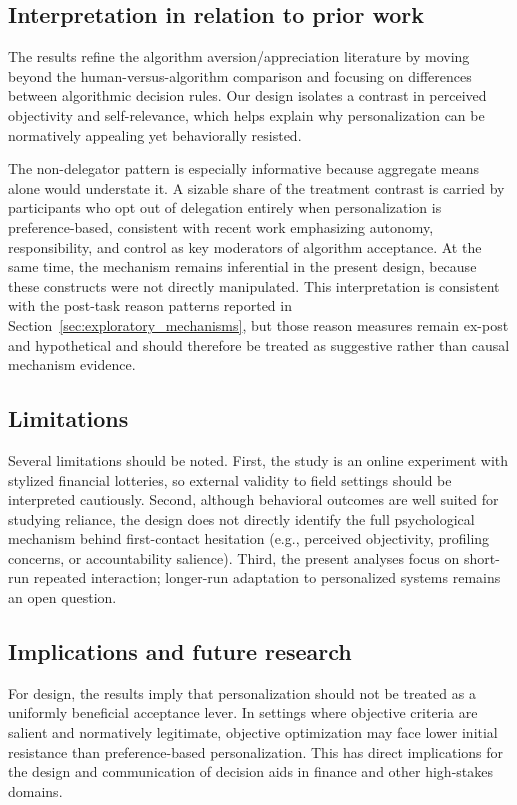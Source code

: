 \documentclass[a4paper, 12pt, fleqn]{article}
\theoremstyle{definition}
\begin{document}
\subsection{Interpretation in relation to prior work}
The results refine the algorithm aversion/appreciation literature by moving beyond the human-versus-algorithm comparison and focusing on differences between algorithmic decision rules. Our design isolates a contrast in perceived objectivity and self-relevance, which helps explain why personalization can be normatively appealing yet behaviorally resisted.

The non-delegator pattern is especially informative because aggregate means alone would understate it. A sizable share of the treatment contrast is carried by participants who opt out of delegation entirely when personalization is preference-based, consistent with recent work emphasizing autonomy, responsibility, and control as key moderators of algorithm acceptance. At the same time, the mechanism remains inferential in the present design, because these constructs were not directly manipulated.
This interpretation is consistent with the post-task reason patterns reported in Section~\ref{sec:exploratory_mechanisms}, but those reason measures remain ex-post and hypothetical and should therefore be treated as suggestive rather than causal mechanism evidence.

\subsection{Limitations}
Several limitations should be noted. First, the study is an online experiment with stylized financial lotteries, so external validity to field settings should be interpreted cautiously. Second, although behavioral outcomes are well suited for studying reliance, the design does not directly identify the full psychological mechanism behind first-contact hesitation (e.g., perceived objectivity, profiling concerns, or accountability salience). Third, the present analyses focus on short-run repeated interaction; longer-run adaptation to personalized systems remains an open question.

\subsection{Implications and future research}
For design, the results imply that personalization should not be treated as a uniformly beneficial acceptance lever. In settings where objective criteria are salient and normatively legitimate, objective optimization may face lower initial resistance than preference-based personalization. This has direct implications for the design and communication of decision aids in finance and other high-stakes domains.
\end{document}
